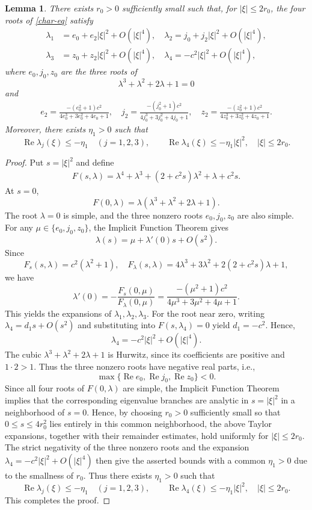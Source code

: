 \documentclass[10pt,reqno]{amsart}
\numberwithin{equation}{section}
\newtheorem{lem}[thm]{Lemma}
\begin{document}
\begin{lem}\label{lem-low}
There exists $r_0>0$ sufficiently small such that, for $|\xi|\le 2r_0$, the four roots of \eqref{char-eq} satisfy
\begin{align*}
\lambda_1&=e_0+e_2|\xi|^2+O(|\xi|^4),\quad \lambda_2=j_0+j_2|\xi|^2+O(|\xi|^4),\\
\lambda_3&=z_0+z_2|\xi|^2+O(|\xi|^4),\quad \lambda_4=-c^2|\xi|^2+O(|\xi|^4),
\end{align*}
where $e_0,j_0,z_0$ are the three roots of
\[
\lambda^3+\lambda^2+2\lambda+1=0
\]
and
\begin{align*}
e_2=\frac{-(e_0^2+1)c^2}{4e_0^3+3e_0^2+4e_0+1},\quad
j_2=\frac{-(j_0^2+1)c^2}{4j_0^3+3j_0^2+4j_0+1},\quad
z_2=\frac{-(z_0^2+1)c^2}{4z_0^3+3z_0^2+4z_0+1}.
\end{align*}
Moreover, there exists $\eta_1>0$ such that
\[
\operatorname{Re}\lambda_j(\xi)\le-\eta_1\quad (j=1,2,3),
\qquad
\operatorname{Re}\lambda_4(\xi)\le-\eta_1|\xi|^2,
\quad |\xi|\le2r_0.
\]
\end{lem}

\begin{proof}
Put $s=|\xi|^2$ and define
\begin{align*}
F(s,\lambda)=\lambda^4+\lambda^3+(2+c^2s)\lambda^2+\lambda+c^2s.
\end{align*}
At $s=0$,
\[
F(0,\lambda)=\lambda\left(\lambda^3+\lambda^2+2\lambda+1\right).
\]
The root $\lambda=0$ is simple, and the three nonzero roots $e_0,j_0,z_0$ are also simple. For any $\mu\in\{e_0,j_0,z_0\}$, the Implicit Function Theorem gives
\[
\lambda(s)=\mu+\lambda'(0)s+O(s^2).
\]
Since
\[
F_s(s,\lambda)=c^2(\lambda^2+1),\quad
F_\lambda(s,\lambda)=4\lambda^3+3\lambda^2+2(2+c^2s)\lambda+1,
\]
we have
\[
\lambda'(0)=-\frac{F_s(0,\mu)}{F_\lambda(0,\mu)}
=\frac{-(\mu^2+1)c^2}{4\mu^3+3\mu^2+4\mu+1}.
\]
This yields the expansions of $\lambda_1,\lambda_2,\lambda_3$.  For the root near zero, writing $\lambda_4=d_1s+O(s^2)$ and substituting into $F(s,\lambda_4)=0$ yield $d_1=-c^2$. Hence,
\[
\lambda_4=-c^2|\xi|^2+O(|\xi|^4).
\]
The cubic $\lambda^3+\lambda^2+2\lambda+1$ is Hurwitz, since its coefficients are positive and $1\cdot 2>1$. Thus the three nonzero roots have negative real parts, i.e.,
\[
\max\{\operatorname{Re}e_0,\operatorname{Re}j_0,\operatorname{Re}z_0\}<0.
\]
Since all four roots of $F(0,\lambda)$ are simple, the Implicit Function Theorem implies that the corresponding eigenvalue branches are analytic in $s=|\xi|^2$ in a neighborhood of $s=0$. Hence, by choosing $r_0>0$ sufficiently small so that $0\le s\le 4r_0^2$ lies entirely in this common neighborhood, the above Taylor expansions, together with their remainder estimates, hold uniformly for $|\xi|\le 2r_0$. The strict negativity of the three nonzero roots and the expansion $\lambda_4=-c^2|\xi|^2+O(|\xi|^4)$ then give the asserted bounds with a common $\eta_1>0$ due to the smallness of $r_0$. Thus there exists $\eta_1>0$ such that
	\[
	\operatorname{Re}\lambda_j(\xi)\le-\eta_1\quad (j=1,2,3),
	\qquad
	\operatorname{Re}\lambda_4(\xi)\le-\eta_1|\xi|^2,
	\quad |\xi|\le2r_0.
	\]
This completes the proof.
\end{proof}
\end{document}
